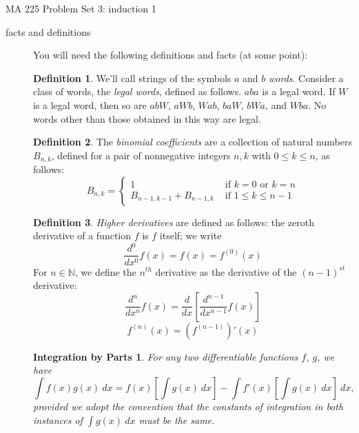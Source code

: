\documentclass[11pt]{letter}
\newtheorem*{IBP}{Integration by Parts}
\theoremstyle{definition}
\newtheorem{defn}{Definition}
\begin{document}
\pagestyle{empty}

{\Large MA 225 Problem Set 3: induction 1}\\

\begin{description}
	\item[facts and definitions] You will need the following definitions and facts (at some point):
			\begin{defn}
				We'll call strings of the symbols $a$ and $b$ {\em words}. Consider a class of words, the {\em legal words}, defined as follows. $aba$ is a legal word. If $W$ is a legal word, then so are $abW$, $aWb$, $Wab$, $baW$, $bWa$, and $Wba$. No words other than those obtained in this way are legal.
			\end{defn}
			\begin{defn}
				The {\em binomial coefficients} are a collection of natural numbers $B_{n,k}$, defined for a pair of nonnegative integers $n,k$ with  $0\leq k\leq n$, as follows:
				$$B_{n,k}=\begin{cases}1 & \text{ if } k=0\text{ or }k=n\\B_{n-1,k-1}+B_{n-1,k} & \text{ if }1\leq k\leq n-1\end{cases}$$
			\end{defn}
			
			\begin{defn}
				{\em Higher derivatives} are defined as follows: the zeroth derivative of a function $f$ is $f$ itself; we write
					$$\frac{d^0}{dx^0}f(x)=f(x)=f^{(0)}(x)$$
				For $n\in \mathbb{N}$, we define the $n^{th}$ derivative as the derivative of the $(n-1)^{st}$ derivative:
					$$\frac{d^n}{dx^n}f(x)=\frac{d}{dx}\left[\frac{d^{n-1}}{dx^{n-1}} f(x)\right]$$
					$$f^{(n)}(x)=\left(f^{(n-1)}\right)'(x)$$
			\end{defn}
			
			\begin{IBP}
				For any two differentiable functions $f$, $g$, we have
				 $$\int f(x)g(x)\ dx = f(x)\left[\int g(x)\ dx\right]-\int f'(x)\left[\int g(x)\ dx\right]\ dx,$$ provided we adopt the convention that the constants of integration in both instances of $\int g(x)\ dx$ must be the same.
			\end{IBP}


\end{description}
\end{document}
